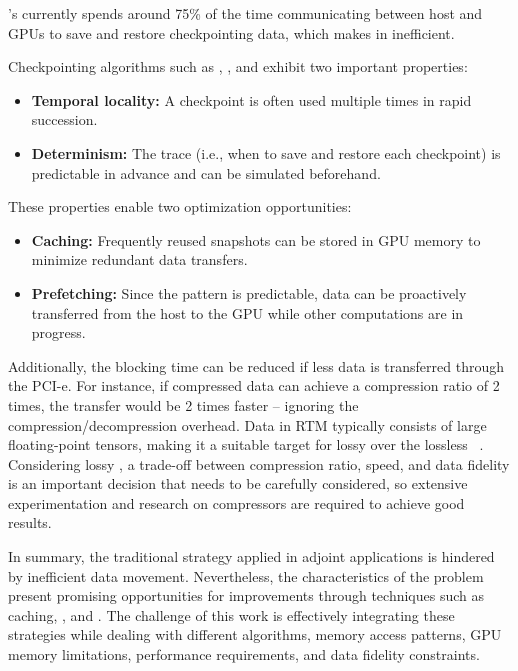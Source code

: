 \documentclass[Ingles,Final]{ic-tese-v3}
\begin{document}
\awave's \checkpointing currently spends around 75\% of the time communicating between host and GPUs to save and restore checkpointing data, which makes \checkpointing in \awave inefficient.

Checkpointing algorithms such as \revolve, \zcut, and \uniform exhibit two important properties:

\begin{itemize}
    \item \textbf{Temporal locality:}  A checkpoint is often used multiple times in rapid succession.
    \item \textbf{Determinism:} The \checkpointing trace (i.e., when to save and restore each checkpoint) is predictable in advance and can be simulated beforehand.
\end{itemize}

These properties enable two optimization opportunities:

\begin{itemize}
    \item \textbf{Caching:} Frequently reused snapshots can be stored in GPU memory to minimize redundant data transfers.
    \item \textbf{Prefetching:} Since the \checkpointing pattern is predictable, data can be proactively transferred from the host to the GPU while other computations are in progress.
\end{itemize}


Additionally, the blocking time can be reduced if less data is transferred through the PCI-e. For instance, if compressed data can achieve a compression ratio of 2 times, the transfer would be 2 times faster -- ignoring the compression/decompression overhead. Data in RTM typically consists of large floating-point tensors, making it a suitable target for lossy \compression over the lossless \compression~\cite{di2025,barbosa2023}. Considering lossy \compression, a trade-off between compression ratio, speed, and data fidelity is an important decision that needs to be carefully considered, so extensive experimentation and research on compressors are required to achieve good results.

In summary, the traditional \checkpointing strategy applied in adjoint applications is hindered by inefficient data movement. Nevertheless, the characteristics of the problem present promising opportunities for improvements through techniques such as caching, \prefetching, and \compression. The challenge of this work is effectively integrating these strategies while dealing with different \checkpointing algorithms, memory access patterns, GPU memory limitations, performance requirements, and data fidelity constraints.
\end{document}
